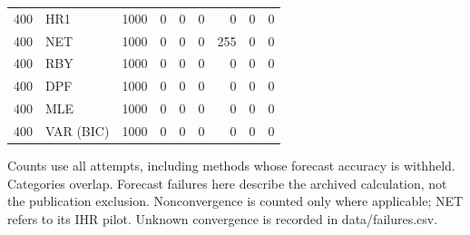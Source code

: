 \begin{table}[p]
{\begin{tabular}{llrrrrrrr}
400 & HR1 & 1000 & 0 & 0 & 0 & 0 & 0 & 0 \\
400 & NET & 1000 & 0 & 0 & 0 & 255 & 0 & 0 \\
400 & RBY & 1000 & 0 & 0 & 0 & 0 & 0 & 0 \\
400 & DPF & 1000 & 0 & 0 & 0 & 0 & 0 & 0 \\
400 & MLE & 1000 & 0 & 0 & 0 & 0 & 0 & 0 \\
400 & VAR (BIC) & 1000 & 0 & 0 & 0 & 0 & 0 & 0 \\
\bottomrule\end{tabular}}
\par\medskip
\begin{minipage}{\linewidth}\footnotesize Counts use all attempts, including methods whose forecast accuracy is withheld. Categories overlap. Forecast failures here describe the archived calculation, not the publication exclusion. Nonconvergence is counted only where applicable; NET refers to its IHR pilot. Unknown convergence is recorded in data/failures.csv. \end{minipage}
\end{table}
